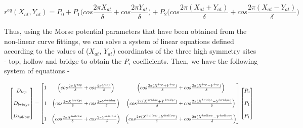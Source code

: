 \documentclass[12pt]{article}
\begin{document}
\[
r^{eq}(X_{at},Y_{at}) = P_0 + P_1 \Big( cos \frac{2\pi X_{at}}{\delta} + cos\frac{2\pi Y_{at}}{\delta} \Big) + P_2 \Big( cos \frac{2\pi (X_{at} + Y_{at})}{\delta} + cos\frac{2\pi (X_{at} - Y_{at})}{\delta}\Big) 
\]

Thus, using the Morse potential parameters that have been obtained from the non-linear curve fittings, we can solve a system of linear equations defined according to the values of ($X_{at}$, $Y_{at}$) coordinates of the three high symmetry sites - top, hollow and bridge to obtain the $P_i$ coefficients. Then, we have the following system of equations - 

\[
\resizebox{\textwidth}{!}{$%
\begin{bmatrix}
D_{top} \\  \\ D_{bridge} \\  \\ D_{hollow}
\end{bmatrix}
=
\begin{bmatrix}
1 & \Big( cos \frac{2\pi X^{top}}{\delta} + cos\frac{2\pi Y^{top}}{\delta} \Big) & \Big( cos \frac{2\pi (X^{top} + Y^{top})}{\delta} + cos\frac{2\pi (X^{top} - Y^{top})}{\delta}\Big) \\ \\
1 & \Big( cos \frac{2\pi X^{bridge}}{\delta} + cos\frac{2\pi Y^{bridge}}{\delta} \Big) & \Big( cos \frac{2\pi (X^{bridge} + Y^{bridge})}{\delta} + cos\frac{2\pi (X^{bridge} - Y^{bridge})}{\delta}\Big) \\ \\
1 & \Big( cos \frac{2\pi X^{hollow}}{\delta} + cos\frac{2\pi Y^{hollow}}{\delta} \Big) & \Big( cos \frac{2\pi (X^{hollow} + Y^{hollow})}{\delta} + cos\frac{2\pi (X^{hollow} - Y^{hollow})}{\delta}\Big) 
\end{bmatrix}
\begin{bmatrix}
P_0 \\  \\ P_1 \\  \\P_1  
\end{bmatrix}$%
}
\]
\end{document}
